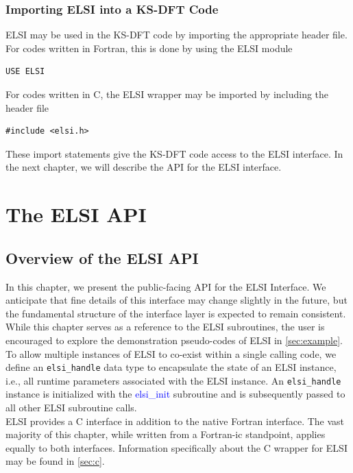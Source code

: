 \documentclass{report}
\begin{document}
\subsection{Importing ELSI into a KS-DFT Code}
\label{subsec:import_use}
ELSI may be used in the KS-DFT code by importing the appropriate header file.  For codes written in Fortran, this is done by using the ELSI module\\

\begin{verbatim}
USE ELSI
\end{verbatim}

For codes written in C, the ELSI wrapper may be imported by including the header file\\

\begin{verbatim}
#include <elsi.h>
\end{verbatim}

These import statements give the KS-DFT code access to the ELSI interface.  In the next chapter, we will describe the API for the ELSI interface.

\chapter{The ELSI API}
\section{Overview of the ELSI API}
\label{sec:api}

In this chapter, we present the public-facing API for the ELSI Interface.  We anticipate that fine details of this interface may change slightly in the future, but the fundamental structure of the interface layer is expected to remain consistent.  While this chapter serves as a reference to the ELSI subroutines, the user is encouraged to explore the demonstration pseudo-codes of ELSI in \ref{sec:example}.\\

To allow multiple instances of ELSI to co-exist within a single calling code, we define an \texttt{elsi\_handle} data type to encapsulate the state of an ELSI instance, i.e., all runtime parameters associated with the ELSI instance.  An \texttt{elsi\_handle} instance is initialized with the \textcolor{blue}{elsi\_init} subroutine and is subsequently passed to all other ELSI subroutine calls.\\

ELSI provides a C interface in addition to the native Fortran interface.  The vast majority of this chapter, while written from a Fortran-ic standpoint, applies equally to both interfaces.  Information specifically about the C wrapper for ELSI may be found in \ref{sec:c}.\\
\end{document}
